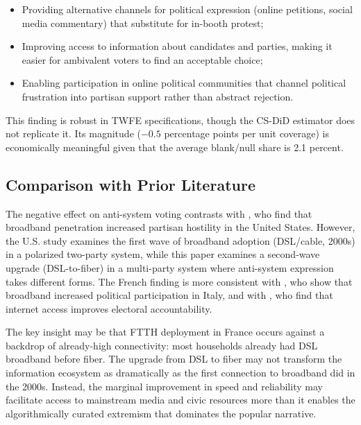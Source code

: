 \documentclass[12pt]{article}
\begin{document}
\begin{itemize}
\item Providing alternative channels for political expression (online petitions, social media commentary) that substitute for in-booth protest;
\item Improving access to information about candidates and parties, making it easier for ambivalent voters to find an acceptable choice;
\item Enabling participation in online political communities that channel political frustration into partisan support rather than abstract rejection.
\end{itemize}

This finding is robust in TWFE specifications, though the CS-DiD estimator does not replicate it. Its magnitude ($-0.5$ percentage points per unit coverage) is economically meaningful given that the average blank/null share is 2.1 percent.

\subsection{Comparison with Prior Literature}

The negative effect on anti-system voting contrasts with \citet{lelkes2017hostile}, who find that broadband penetration increased partisan hostility in the United States. However, the U.S. study examines the first wave of broadband adoption (DSL/cable, 2000s) in a polarized two-party system, while this paper examines a second-wave upgrade (DSL-to-fiber) in a multi-party system where anti-system expression takes different forms. The French finding is more consistent with \citet{campante2018long}, who show that broadband increased political participation in Italy, and with \citet{falck2014does}, who find that internet access improves electoral accountability.

The key insight may be that FTTH deployment in France occurs against a backdrop of already-high connectivity: most households already had DSL broadband before fiber. The upgrade from DSL to fiber may not transform the information ecosystem as dramatically as the first connection to broadband did in the 2000s. Instead, the marginal improvement in speed and reliability may facilitate access to mainstream media and civic resources more than it enables the algorithmically curated extremism that dominates the popular narrative.


\end{document}
